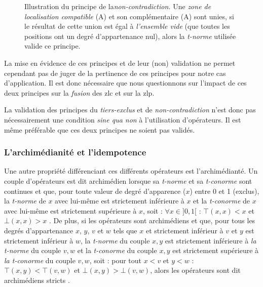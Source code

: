 \begin{figure}
  \centering
  
  \caption[Illustration du principe de la
  \emph{non-contradiction}]{Illustration du principe de
    la\emph{non-contradiction.}  Une \emph{zone de localisation
      compatible} (\textcolor{RdBu-9-1}{\textsf{A}}) et son
    complémentaire (\textcolor{RdBu-9-9}{\textsf{A}}) sont
    unies, si le résultat de cette union est égal à \emph{l'ensemble
      vide} (\ie que toutes les positions ont un degré d'appartenance
    nul), alors la \emph{t-norme} utilisée valide ce principe.}
  \label{fig:non-contradiction}
\end{figure}

La mise en évidence de ces principes et de leur (non) validation ne
permet cependant pas de juger de la pertinence de ces principes pour
notre cas d’application. Il est donc nécessaire que nous questionnons
sur l'impact de ces deux principes sur la \emph{fusion} des \ac{zlc}
et sur la \ac{zlp}.




La validation des principes du \emph{tiers-exclus} et de
\emph{non-contradiction} n'est donc pas nécessairement une condition
\emph{sine qua non} à l'utilisation d'opérateurs. Il est même
préférable que ces deux principes ne soient pas validés.

\subsubsection{L'archimédianité et l’idempotence}

Une autre propriété différenciant ces différents opérateurs est
l'archimédianté. Un couple d'opérateurs est dit archimédien lorsque sa
\emph{t-norme} et sa \emph{t-conorme} sont continues et que, pour
toute valeur de degré d’apparence (\(x\)) entre 0 et 1 (exclus), la
\emph{t-norme} de \(x\) avec lui-même est strictement inférieure à
\(x\) et la \emph{t-conorme} de \(x\) avec lui-même est strictement
supérieure à \(x\), soit : \(\forall x \in ]0,1[\) : \(⊤(x,x) < x\) et
\(⊥(x,x) > x\) \autocite{Bouchon-Meunier1995}. De plus, si les
opérateurs sont archimédiens et que, pour tous les degrés
d'appartenance \(x\), \(y\), \(v\) et \(w\) tels que \(x\) et
strictement inférieur à \(v\) et \(y\) est strictement inférieur à
\(w\), la \emph{t-norme} du couple \(x,y\) est strictement inférieure
à \emph{la t-norme} du couple \(v, w\) et la \emph{t-conorme} du
couple \(x,y\) est strictement supérieure à \emph{la t-conorme} du
couple \(v, w\), soit : pour tout \(x < v\) et \(y < w\) :
\(⊤(x,y) < ⊤(v,w)\) et \(⊥(x,y) > ⊥(v,w)\), alors les opérateurs sont
dit archimédiens stricts \autocite{Bouchon-Meunier1995}.

